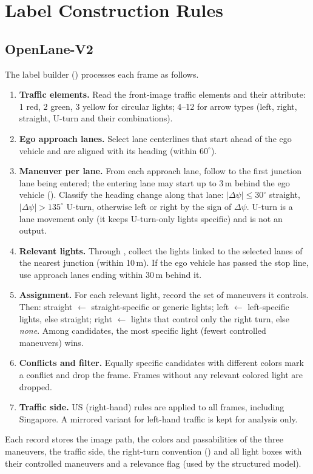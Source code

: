 \chapter{Label Construction Rules}
\label{app:labels}

\section{OpenLane-V2}

The label builder () processes each frame as follows.

\begin{enumerate}
  \item \textbf{Traffic elements.} Read the front-image traffic elements and their attribute: 1 red,
        2 green, 3 yellow for circular lights; 4--12 for arrow types (left, right, straight, U-turn and
        their combinations).
  \item \textbf{Ego approach lanes.} Select lane centerlines that start ahead of the ego vehicle and are
        aligned with its heading (within $60^\circ$).
  \item \textbf{Maneuver per lane.} From each approach lane, follow  to the first
        junction lane being entered; the entering lane may start up to 3\,m behind the ego vehicle
        (). Classify the heading change along that lane: $|\Delta\psi|\le30^\circ$
        straight, $|\Delta\psi|>135^\circ$ U-turn, otherwise left or right by the sign of $\Delta\psi$.
        U-turn is a lane movement only (it keeps U-turn-only lights specific) and is not an output.
  \item \textbf{Relevant lights.} Through , collect the lights linked to the selected
        lanes of the nearest junction (within 10\,m). If the ego vehicle has passed the stop line, use
        approach lanes ending within 30\,m behind it.
  \item \textbf{Assignment.} For each relevant light, record the set of maneuvers it controls. Then:
        straight $\leftarrow$ straight-specific or generic lights; left $\leftarrow$ left-specific lights,
        else straight; right $\leftarrow$ lights
        that control only the right turn, else \emph{none}. Among candidates, the most specific light
        (fewest controlled maneuvers) wins.
  \item \textbf{Conflicts and filter.} Equally specific candidates with different colors mark a conflict
        and drop the frame. Frames without any relevant colored light are dropped.
  \item \textbf{Traffic side.} US (right-hand) rules are applied to all frames, including Singapore. A
        mirrored variant for left-hand traffic is kept for analysis only.
\end{enumerate}
Each record stores the image path, the colors and passabilities of the three maneuvers, the traffic side, the
right-turn convention () and all light boxes with their controlled maneuvers and a
relevance flag (used by the structured model).

